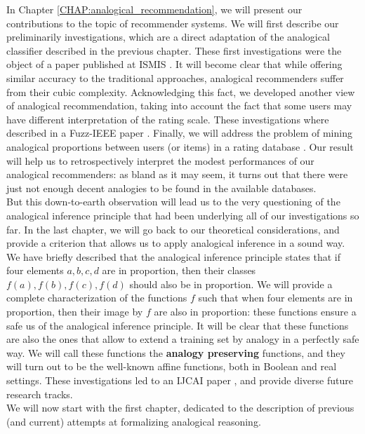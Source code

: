 In Chapter \ref{CHAP:analogical_recommendation}, we will present our
contributions to the topic of recommender systems. We will first describe our
preliminarily investigations, which are a direct adaptation of the analogical
classifier described in the previous chapter. These first investigations were
the object of a paper published at ISMIS \cite{HugPraRicISMIS15}. It will
become clear that while offering similar accuracy to the traditional
approaches, analogical recommenders suffer from their cubic complexity.
Acknowledging this fact, we developed another view of analogical
recommendation, taking into account the fact that some users may have different
interpretation of the rating scale. These investigations where described in a
Fuzz-IEEE paper \cite{HugPraRicSerFuzzIEEE16}. Finally, we will address the
problem of mining analogical proportions between users (or items) in a rating
database \cite{HugPraRicSerLFA16}. Our result will help us to retrospectively
interpret the modest performances of our analogical recommenders: as bland as
it may seem, it turns out that there were just not enough decent analogies to
be found in the available databases.\\

But this down-to-earth observation will lead us to the very questioning of
the analogical inference principle that had been underlying all of our
investigations so far. In the last chapter, we will go back to our theoretical
considerations, and provide a criterion that allows us to apply analogical
inference in a sound way. We have briefly described that the analogical
inference principle states that if four elements $a, b, c, d$ are in
proportion, then their classes $f(a), f(b), f(c), f(d)$ should also be in
proportion. We will provide a complete characterization of the functions $f$
such that when four elements are in proportion, then their image by $f$ are
also in proportion: these functions ensure a safe us of the analogical
inference principle. It will be clear that these functions are also the ones
that allow to extend a training set by analogy in a perfectly safe way. We will
call these functions the \textbf{analogy preserving} functions, and they will
turn out to be the well-known affine functions, both in Boolean and real
settings. These investigations led to an IJCAI paper
\cite{CouHugPraRicIJCAI17}, and provide diverse future research tracks.\\


We will now start with the first chapter, dedicated to the description of
previous (and current) attempts at formalizing analogical reasoning.
